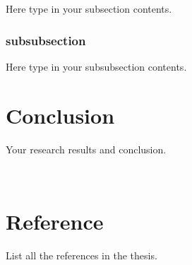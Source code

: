 \documentclass[11pt,a4paper]{article}
\begin{document}
Here type in your subsection contents.

\subsubsection{subsubsection}

Here type in your subsubsection contents.

\newpage

\section{Conclusion}

Your research results and conclusion.

\

\newpage

\section*{Reference}

List all the references in the thesis.
\end{document}
